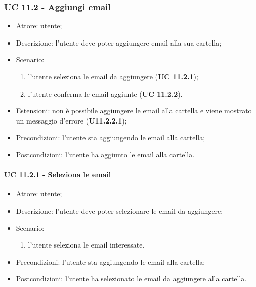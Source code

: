     \subsubsection{UC 11.2 - Aggiungi email}
    \begin{itemize}
        \item Attore: utente;
        \item Descrizione: l'utente deve poter aggiungere email alla sua cartella;
        \item Scenario:
        \begin{enumerate}
        \item l'utente seleziona le email da aggiungere (\textbf{UC 11.2.1});
        \item l'utente conferma le email aggiunte (\textbf{UC 11.2.2}).
        \end{enumerate}
        \item Estensioni: non è possibile aggiungere le email alla cartella e viene mostrato un messaggio d'errore (\textbf{U11.2.2.1});
        \item Precondizioni: l'utente sta aggiungendo le email alla cartella;
        \item Postcondizioni: l'utente ha aggiunto le email alla cartella.
    \end{itemize}
    \paragraph{UC 11.2.1 - Seleziona le email}
        \begin{itemize}
            \item Attore: utente;
            \item Descrizione: l'utente deve poter selezionare le email da aggiungere;
            \item Scenario:
            \begin{enumerate}
                \item l'utente seleziona le email interessate.
            \end{enumerate}
        \item Precondizioni: l'utente sta aggiungendo le email alla cartella;
        \item Postcondizioni: l'utente ha selezionato le email da aggiungere alla cartella.
    \end{itemize}

